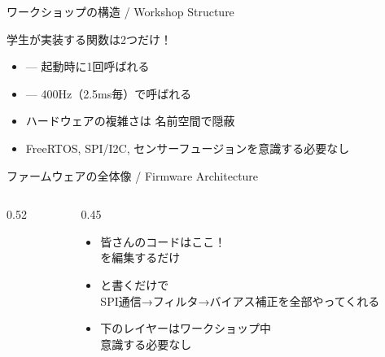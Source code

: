 \documentclass[aspectratio=169, 14pt]{beamer}
\begin{document}
\begin{frame}{ワークショップの構造 / Workshop Structure}
  \begin{block}{学生が実装する関数は2つだけ！}
    \begin{itemize}
      \item {} --- 起動時に1回呼ばれる
      \item {} --- 400Hz（2.5ms毎）で呼ばれる
    \end{itemize}
  \end{block}

  \vspace{0.5em}

  \begin{itemize}
    \item ハードウェアの複雑さは  名前空間で隠蔽
    \item FreeRTOS, SPI/I2C, センサーフュージョンを意識する必要なし
  \end{itemize}
\end{frame}

\begin{frame}{ファームウェアの全体像 / Firmware Architecture}
  \begin{columns}[T]
    \begin{column}{0.52\textwidth}
      \centering
      \vspace{-2mm}
      \resizebox{0.95\columnwidth}{!}{}
    \end{column}
    \begin{column}{0.45\textwidth}
      \footnotesize
      \begin{itemize}\setlength{\itemsep}{4pt}
        \item 皆さんのコードはここ！\\
               を編集するだけ
        \item {} と書くだけで\\
              SPI通信→フィルタ→バイアス補正を全部やってくれる
        \item 下のレイヤーはワークショップ中\\
              意識する必要なし
      \end{itemize}
    \end{column}
  \end{columns}
\end{frame}
\end{document}
